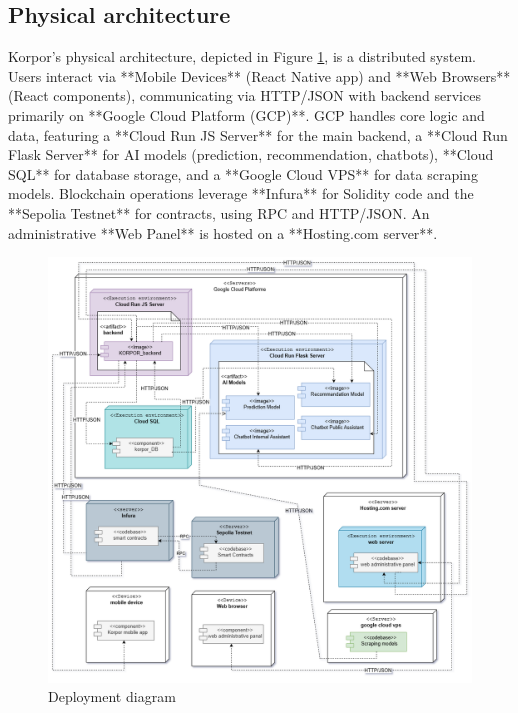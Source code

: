 \subsection{Physical architecture}

Korpor's physical architecture, depicted in Figure \ref{fig:physical-architecture}, is a distributed system. Users interact via **Mobile Devices** (React Native app) and **Web Browsers** (React components), communicating via HTTP/JSON with backend services primarily on **Google Cloud Platform (GCP)**. GCP handles core logic and data, featuring a **Cloud Run JS Server** for the main backend, a **Cloud Run Flask Server** for AI models (prediction, recommendation, chatbots), **Cloud SQL** for database storage, and a **Google Cloud VPS** for data scraping models. Blockchain operations leverage **Infura** for Solidity code and the **Sepolia Testnet** for contracts, using RPC and HTTP/JSON. An administrative **Web Panel** is hosted on a **Hosting.com server**. 

\begin{figure}[htbp]
    \centering
    \includegraphics[width=1.03\textwidth]{images/deploiement_general_diag.png}
    \caption{Deployment diagram}
    \label{fig:physical-architecture}
\end{figure}

